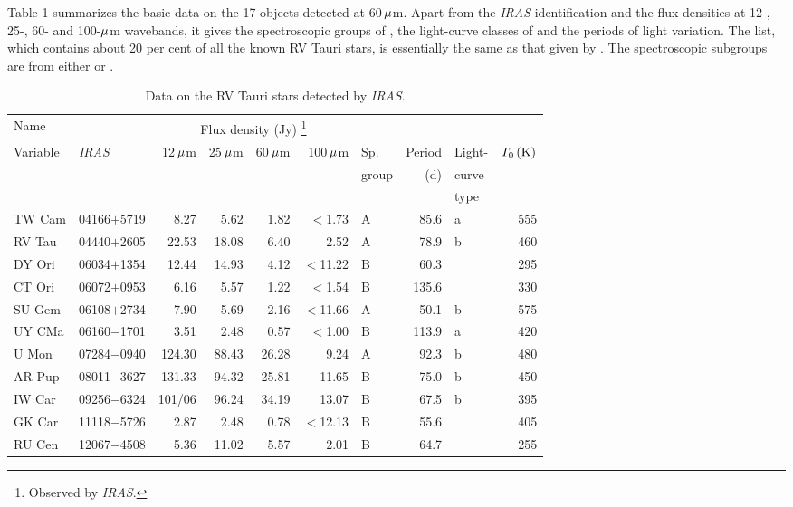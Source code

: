 \documentclass[useAMS,usenatbib]{mn2e}
\begin{document}
Table 1 summarizes the basic data on the 17 objects  detected at
\hbox{60\,$\mu$m}. Apart from the {\it IRAS\/} identification and
the flux densities at 12-, 25-, 60-  and 100-$\mu$m wavebands, it
gives the spectroscopic groups of \citet{b20}, the light-curve
classes of \citet{b13} and the periods of light variation. The
list, which contains  about 20 per cent of all the known RV Tauri
stars, is  essentially the same as that given by \citet{b12}. The
spectroscopic subgroups are from either \citet{b20} or
\citet{b15}.
\begin{table*}
 \centering
 \begin{minipage}{140mm}
  \caption{Data on the RV Tauri stars detected by {\it IRAS}.}
  \begin{tabular}{@{}llrrrrlrlr@{}}
  \hline
   Name     &            & \multicolumn{4}{c}{Flux density (Jy)%
  \footnote{Observed by {\em IRAS}.}}\\
   Variable & {\it IRAS} & 12$\,\mu$m & 25$\,\mu$m & 60$\,\mu$m
     & 100$\,\mu$m & Sp. & Period & Light- & $T_0\,({\mathrm{K}})$ \\
        &  &  &  &  &  & group & (d) & curve \\
        &  &  &  &  &  &       &     & type  \\
 \hline
 TW Cam & 04166$+$5719 & 8.27 & 5.62 & 1.82 & $<$1.73 & A & 85.6 & a & 555 \\
 RV Tau & 04440$+$2605 & 22.53 & 18.08 & 6.40 & 2.52 & A & 78.9 & b & 460 \\
 DY Ori & 06034$+$1354 & 12.44 & 14.93 & 4.12 & $<$11.22 & B & 60.3 &  & 295 \\
 CT Ori & 06072$+$0953 & 6.16 & 5.57 & 1.22 & $<$1.54 & B & 135.6 &  & 330 \\
 SU Gem & 06108$+$2734 & 7.90 & 5.69 & 2.16 & $<$11.66 & A & 50.1 & b & 575 \\
 UY CMa & 06160$-$1701 & 3.51 & 2.48 & 0.57 & $<$1.00 & B & 113.9 & a & 420 \\
 U Mon  & 07284$-$0940 & 124.30 & 88.43 & 26.28 & 9.24 & A & 92.3 & b & 480 \\
 AR Pup & 08011$-$3627 & 131.33 & 94.32 & 25.81 & 11.65 & B & 75.0 & b & 450 \\
 IW Car & 09256$-$6324 & 101/06 & 96.24 & 34.19 & 13.07 & B & 67.5 & b & 395 \\
 GK Car & 11118$-$5726 & 2.87 & 2.48 & 0.78 & $<$12.13 & B & 55.6 &  & 405 \\
 RU Cen & 12067$-$4508 & 5.36 & 11.02 & 5.57 & 2.01 & B & 64.7 &  & 255 \\

\end{tabular}
\end{minipage}
\end{table*}
\end{document}
